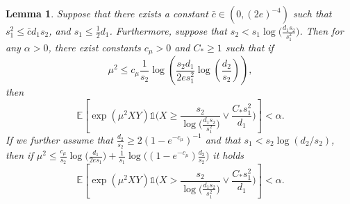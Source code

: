 \documentclass{article}
\newcommand{\EE}{\mathbb{E}}
\newcommand{\one}{\mathds{1}}
\newcommand{\Ct}{C_{*}}
\newtheorem{lemma}{Lemma}
\theoremstyle{remark}
\begin{document}
\begin{lemma}\label{lem_max_test_lower_bound}
    Suppose that there exists a constant $\bar{c} \in (0,(2e)^{-4})$ such that $s_1^2 \leq \bar{c}d_1s_2$, and $s_1 \leq \frac12d_1$. 
    Furthermore, suppose that $s_2 < s_1\log\big(\frac{d_1s_2}{s_1^2}\big)$. Then for any $\alpha > 0$, there exist  constants $c_\mu > 0$ and $C_* \geq 1$ such that if 
    $$\mu^2 \leq c_\mu\frac{1}{s_2}\log\left(\frac{s_2d_1}{2es_1^2} \log\left(\frac{d_2}{s_2}\right)\right),$$
    then 
    \[\EE\left[\exp(\mu^2XY)\one\Big(X \geq \frac{s_2}{\log\big(\frac{d_1s_2}{s_1^2}\big)}\vee   \frac{\Ct s_1^2}{d_1}\Big)\right] < \alpha.\]
    If we further assume that $\frac{d_2}{s_2} \geq 2(1 - e^{-c_\mu})^{-1}$ and that $s_1 < s_2\log(d_2/s_2)$, then if $\mu^2 \leq \frac{c_\mu}{s_2}\log\big(\frac{d_1}{2es_1}\big) + \frac{1}{s_1}\log\big((1-e^{-c_\mu})\frac{d_2}{s_2}\big)$ it holds
\[\EE\left[\exp(\mu^2XY)\one\Big(X > \frac{s_2}{\log\big(\frac{d_1s_2}{s_1^2}\big)}\vee   \frac{\Ct s_1^2}{d_1}\Big)\right] < \alpha.\]
\end{lemma}
\end{document}
